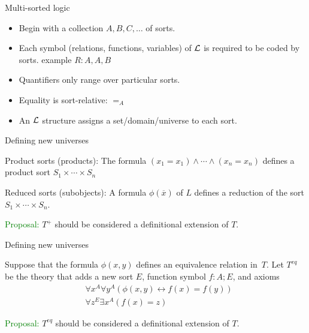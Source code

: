 \documentclass{beamer}
\begin{document}
\begin{frame}{Multi-sorted logic}

\begin{itemize}
\item Begin with a collection $A,B,C,\dots $ of sorts.
\item Each symbol (relations, functions, variables) of $\mathcal L$ is
  required to be coded by sorts.  example $R:A,A,B$
\item Quantifiers only range over particular sorts.
\item Equality is sort-relative: $=_A$
\item An $\mathcal L$ structure assigns a set/domain/universe to each sort.
\end{itemize}


\end{frame}


\begin{frame}{Defining new universes}


Product sorts (products): The formula $(x_1=x_1)\wedge \cdots \wedge
(x_n=x_n)$ defines a product sort $S_1\times \cdots \times S_n$

\bigskip Reduced sorts (subobjects): A formula $\phi (\overline{x})$
of $L$ defines a reduction of the sort $S_1\times \cdots \times S_n$.

\bigskip \textcolor{green}{Proposal:} $T^+$ should be considered a
definitional extension of $T$.






\end{frame}

\begin{frame}{Defining new universes}


  Suppose that the formula $\phi (x,y)$ defines an equivalence
  relation in~$T$.  Let $T^{eq}$ be the theory that adds a new sort
  $E$, function symbol $f:A;E$, and axioms
  \[ \begin{aligned}
& \forall x^A\forall y^A(\phi (x,y)\leftrightarrow f(x)=f(y)) \\
& \forall z^E\exists x^A(f(x)=z) \end{aligned} \]

\textcolor{green}{Proposal:} $T^{eq}$ should be considered a
definitional extension of $T$.

\end{frame}
\end{document}
